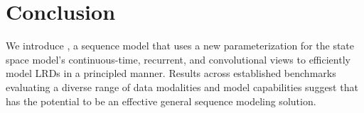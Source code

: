 
\section{Conclusion}
\label{sec:conclusion}

We introduce \methodabbrv, a sequence model that uses a new parameterization for the state space model's continuous-time, recurrent, and convolutional views to efficiently model LRDs in a principled manner.
Results across established benchmarks evaluating a diverse range of data modalities and model capabilities
suggest that \methodabbrv{} has the potential to be an effective general sequence modeling solution.
